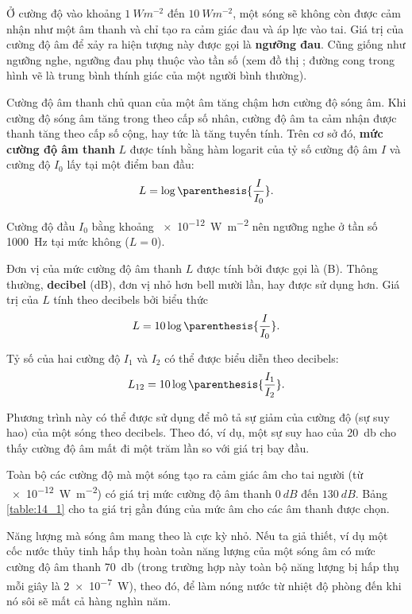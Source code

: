 Ở cường độ vào khoảng $\SI{1}{W m^{-2}}$ đến  $\SI{10}{W m^{-2}}$, một sóng sẽ không còn được cảm nhận như một âm thanh và chỉ tạo ra cảm giác đau và áp lực vào tai. Giá trị của cường độ âm để xảy ra hiện tượng này được gọi là \textbf{ngưỡng đau}. Cũng giống như ngưỡng nghe, ngưỡng đau phụ thuộc vào tần số (xem đồ thị ; đường cong trong hình vẽ là trung bình thính giác của một người bình thường). %

Cường độ âm thanh chủ quan của một âm tăng chậm hơn cường độ sóng âm. Khi cường độ sóng âm tăng trong theo cấp số nhân, cường độ âm ta cảm nhận được thanh tăng theo cấp số cộng, hay tức là tăng tuyến tính. Trên cơ sở đó, \textbf{mức cường độ âm thanh} $L$ được tính bằng hàm logarit của tỷ số cường độ âm $I$ và cường độ $I_0$ lấy tại một điểm ban đầu:
\begin{equation}\label{eq:14_62}
	L = \log\parenthesis{\frac{I}{I_0}}.
\end{equation}

\noindent
Cường độ đầu $I_0$ bằng khoảng \SI{e-12}{\watt\per\metre\squared} nên ngưỡng nghe ở tần số \SI{1000}{\hertz} tại mức không ($L = 0$).

Đơn vị của mức cường độ âm thanh $L$ được tính bởi  được gọi là  (B). Thông thường, \textbf{decibel} (dB), đơn vị nhỏ hơn bell mười lần, hay được sử dụng hơn. Giá trị của $L$ tính theo decibels bởi biểu thức
\begin{equation}\label{eq:14_63}
	L = 10 \log\parenthesis{\frac{I}{I_0}}.
\end{equation}

Tỷ số của hai cường độ $I_1$ và $I_2$ có thể được biểu diễn theo decibels: 
\begin{equation}\label{eq:14_64}
	L_{12} = 10 \log\parenthesis{\frac{I_1}{I_2}}.
\end{equation}

\noindent
Phương trình này có thể được sử dụng để mô tả sự giảm của cường độ (sự suy hao) của một sóng theo decibels.  Theo đó, ví dụ, một sự suy hao của \SI{20}{\decibel} cho thấy cường độ âm mất đi một trăm lần so với giá trị bay đầu.

Toàn bộ các cường độ mà một sóng tạo ra cảm giác âm cho tai người (từ \SI{e-12}{\watt\per\metre\squared}) có giá trị mức cường độ âm thanh $\SI{0}{dB}$ đến $\SI{130}{dB}$. Bảng \ref{table:14_1} cho ta giá trị gần đúng của mức âm cho các âm thanh được chọn.

Năng lượng mà sóng âm mang theo là cực kỳ nhỏ. Nếu ta giả thiết, ví dụ một cốc nước thủy tinh hấp thụ hoàn toàn năng lượng của một sóng âm có mức cường độ âm thanh \SI{70}{\decibel} (trong trường hợp này toàn bộ năng lượng bị hấp thụ mỗi giây là \SI{2e-7}{\watt}), theo đó, để làm nóng nước từ nhiệt độ phòng đến khi nó sôi sẽ mất cả hàng nghìn năm.

